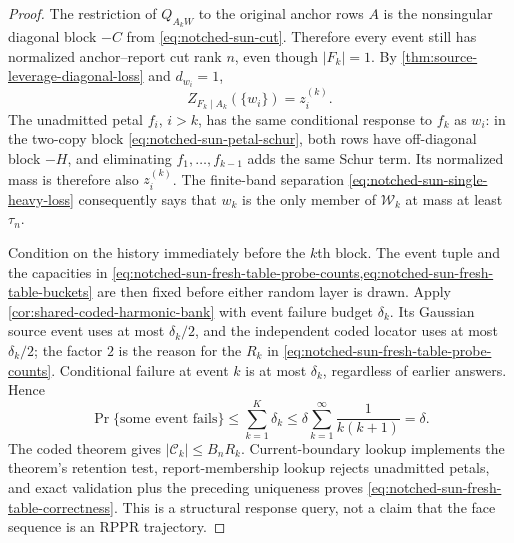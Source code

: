 \begin{proof}
The restriction of $Q_{A_kW}$ to the original anchor rows $A$ is the
nonsingular diagonal block $-C$ from
\cref{eq:notched-sun-cut}.  Therefore every event still has normalized
anchor--report cut rank $n$, even though $|F_k|=1$.  By
\cref{thm:source-leverage-diagonal-loss} and $d_{w_i}=1$,
\begin{equation}
 Z_{F_k\mid A_k}(\{w_i\})=z_i^{(k)}.
 \label{eq:notched-sun-fresh-table-loss-identity}
\end{equation}
The unadmitted petal $f_i$, $i>k$, has the same conditional response to
$f_k$ as $w_i$: in the two-copy block
\cref{eq:notched-sun-petal-schur}, both rows have off-diagonal block $-H$,
and eliminating $f_1,\ldots,f_{k-1}$ adds the same Schur term.  Its normalized
mass is therefore also $z_i^{(k)}$.  The finite-band separation
\cref{eq:notched-sun-single-heavy-loss} consequently says that $w_k$ is the
only member of $\mathcal W_k$ at mass at least $\tau_n$.

Condition on the history immediately before the $k$th block.  The event tuple
and the capacities in
\cref{eq:notched-sun-fresh-table-probe-counts,eq:notched-sun-fresh-table-buckets}
are then fixed before either random layer is drawn.  Apply
\cref{cor:shared-coded-harmonic-bank} with event failure budget $\delta_k$.
Its Gaussian source event uses at most $\delta_k/2$, and the independent coded
locator uses at most $\delta_k/2$; the factor $2$ is the reason for the
$R_k$ in \cref{eq:notched-sun-fresh-table-probe-counts}.  Conditional failure
at event $k$ is at most $\delta_k$, regardless of earlier answers.  Hence
\begin{equation*}
 \Pr\{\text{some event fails}\}
 \leq\sum_{k=1}^K\delta_k
 \leq\delta\sum_{k=1}^{\infty}\frac1{k(k+1)}
 =\delta.
\end{equation*}
The coded theorem gives $|\mathcal C_k|\leq B_nR_k$.  Current-boundary lookup
implements the theorem's retention test, report-membership lookup rejects
unadmitted petals, and exact validation plus the preceding uniqueness proves
\cref{eq:notched-sun-fresh-table-correctness}.  This is a structural response
query, not a claim that the face sequence is an RPPR trajectory.


\end{proof}
